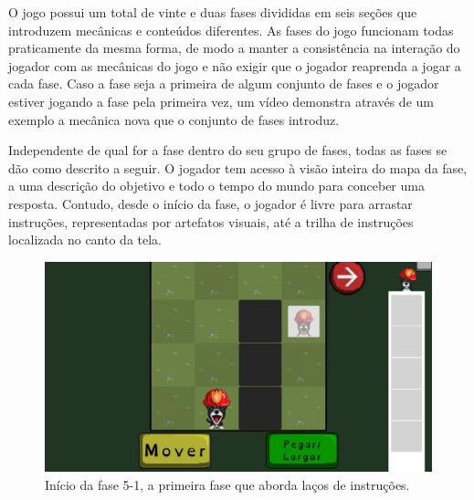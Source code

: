 \documentclass[conference]{IEEEtran}
\begin{document}
O jogo possui um total de vinte e duas fases divididas em seis seções que introduzem mecânicas e conteúdos diferentes. As fases do jogo funcionam todas praticamente da mesma forma, de modo a manter a consistência na interação do jogador com as mecânicas do jogo e não exigir que o jogador reaprenda a jogar a cada fase. Caso a fase seja a primeira de algum conjunto de fases e o jogador estiver jogando a fase pela primeira vez, um vídeo demonstra através de um exemplo a mecânica nova que o conjunto de fases introduz.

Independente de qual for a fase dentro do seu grupo de fases, todas as fases se dão como descrito a seguir. O jogador tem acesso à visão inteira do mapa da fase, a uma descrição do objetivo e todo o tempo do mundo para conceber uma resposta. Contudo, desde o início da fase, o jogador é livre para arrastar instruções, representadas por artefatos visuais, até a trilha de instruções localizada no canto da tela.

\begin{figure}[htbp]
\centerline{\includegraphics[scale=0.275]{images/fig01.jpg}}
\caption{Início da fase 5-1, a primeira fase que aborda laços de instruções.}
\label{fig}
\end{figure}
\end{document}
